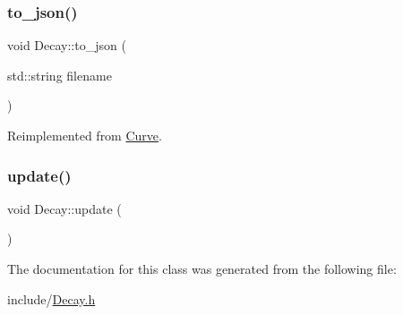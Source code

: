 \mbox{\label{class_decay_afb84196cbc6cc532bf0ce5db85f39616}} 
\subsubsection{\texorpdfstring{to\+\_\+json()}{to\_json()}}
{\footnotesize\ttfamily void Decay\+::to\+\_\+json (\begin{DoxyParamCaption}\item[{std\+::string}]{filename }\end{DoxyParamCaption})\hspace{0.3cm}{\ttfamily [virtual]}}



Reimplemented from \hyperlink{class_curve_a6c16b3a6a4f4bd9540780d4e68d90545}{Curve}.

\mbox{\label{class_decay_a9893be298ea279231a0476810d52f2d0}} 
\subsubsection{\texorpdfstring{update()}{update()}}
{\footnotesize\ttfamily void Decay\+::update (\begin{DoxyParamCaption}{ }\end{DoxyParamCaption})}



The documentation for this class was generated from the following file\+:\begin{DoxyCompactItemize}
\item 
include/\hyperlink{_decay_8h}{Decay.\+h}\end{DoxyCompactItemize}
